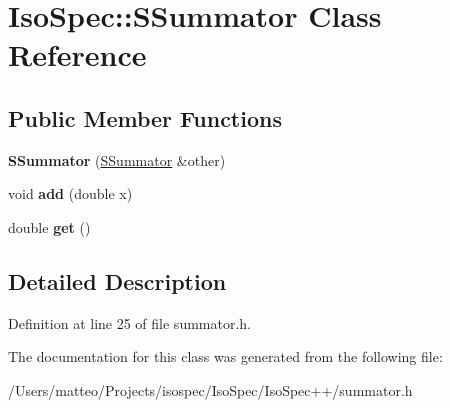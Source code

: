 \hypertarget{class_iso_spec_1_1_s_summator}{}\section{Iso\+Spec\+:\+:S\+Summator Class Reference}
\label{class_iso_spec_1_1_s_summator}
\subsection*{Public Member Functions}
\begin{DoxyCompactItemize}
\item 
\mbox{\label{class_iso_spec_1_1_s_summator_a5173dbb75fb32ad67bf3abd1ae6f9dc6}} 
{\bfseries S\+Summator} (\mbox{\hyperlink{class_iso_spec_1_1_s_summator}{S\+Summator}} \&other)
\item 
\mbox{\label{class_iso_spec_1_1_s_summator_aad1c7ce5e38ce2da7d9e39f43e647402}} 
void {\bfseries add} (double x)
\item 
\mbox{\label{class_iso_spec_1_1_s_summator_ab7b2c53b5e9258aa4c7e7707089fbb6a}} 
double {\bfseries get} ()
\end{DoxyCompactItemize}


\subsection{Detailed Description}


Definition at line 25 of file summator.\+h.



The documentation for this class was generated from the following file\+:\begin{DoxyCompactItemize}
\item 
/\+Users/matteo/\+Projects/isospec/\+Iso\+Spec/\+Iso\+Spec++/summator.\+h\end{DoxyCompactItemize}
